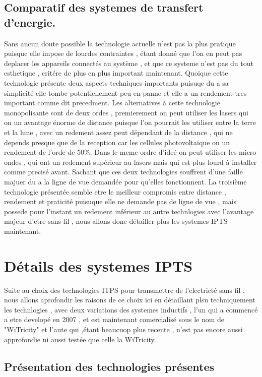 \documentclass[12pt]{report}
\begin{document}
\section{Comparatif des systemes de transfert d'energie.}
	Sans aucun doute possible la technologie actuelle n'est pas la plus pratique puisque elle impose de lourdes contraintes , étant donné que l'on en peut pas deplacer les appareils connectés au système , et que ce systeme n'est pas du tout esthetique , critére de plus en plus important maintenant. Quoique cette technologie présente deux aspects techniques importants puisuqe du a sa simplicité elle tombe potentiellement peu en panne et elle a un rendement tres important comme dit precedment. Les alternatives à cette technologie monopolisante sont de deux ordes , premierement on peut utiliser les lasers qui on un avantage énorme de distance puisque l'on pourrait les utiliser entre la terre et la lune , avec un redement assez peut dépendant de la distance , qui ne depends presque que de la reception car les cellules photovoltaïque on un rendement de l'orde de 50\%. Dans le meme ordre d'ideé on peut utiliser les micro ondes , qui ont un redement supérieur au lasers mais qui est plus lourd à installer comme precisé avant. Sachant que ces deux technologies souffrent d'une faille majuer du a la ligne de vue demandée pour qu'elles fonctionnent. La troisième technologie présentée semble etre le meilleur compromis entre distance , rendement et praticité puisuque elle ne demande pas de ligne de vue , mais possede pour l'instant un redement inférieur au autre technlogies avec l'avantage majeur d'etre sans-fil , nous allons donc détailler plus les systemes IPTS maintenant.

\chapter{Détails des systemes IPTS}
  Suite au choix des technologies ITPS pour transmettre de l'electricté sans fil , nous allons aprofondir les raisons de ce choix ici en détaillant plsu techniquement les technlogies , avec deux variations des systemes inductifs , l'un qui a commencé a etre developé en 2007 , et est maintenant comercialisé sous le nom de "WiTricity" et l'aute qui ,étant beaucuop plus recente , n'est pas encore aussi approfondie ni aussi testée que celle la WiTricity.
\section{Présentation des technologies présentes}
\end{document}
